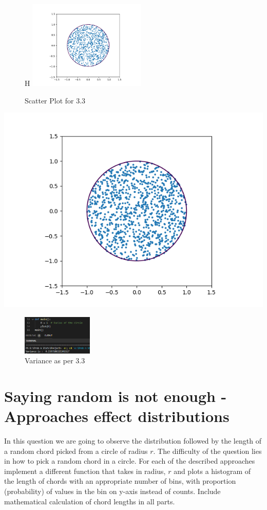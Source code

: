 \documentclass[answers]{exam}
\begin{document}
\begin{framed}
    \begin{figure}{H}
        \centering
        \includegraphics[width= 0.5\textwidth]{Q3.3_scatter_plot.png}
        \caption{Scatter Plot for 3.3}
    \end{figure}
    \includegraphics[scale=0.5]{Q3.3_scatter_plot.png}
    \begin{figure}[H]
        \centering
        \includegraphics[width= 0.3\textwidth]{Q3.3_variance.PNG}
        \caption{Variance as per 3.3}
    \end{figure}
    
\end{framed}
\section{Saying random is not enough - Approaches effect distributions}
In this question we are going to observe the distribution followed by the length of a random chord picked from a circle of radius $r$.
The difficulty of the question lies in how to pick a random chord in a circle. For each of the described approaches implement a different function that takes in radius, $r$ and plots a histogram of the length of chords with an appropriate number of bins, with proportion (probability) of values in the bin on y-axis instead of counts. Include mathematical calculation of chord lengths in all
parts.  \\
\end{document}
